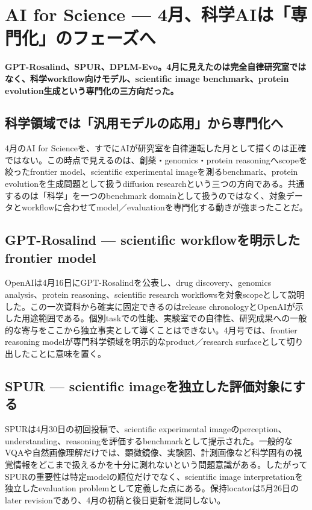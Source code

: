 \section{AI for Science — 4月、科学AIは「専門化」のフェーズへ}
\label{pkg:ai-science-april}
\noindent\textbf{GPT-Rosalind、SPUR、DPLM-Evo。4月に見えたのは完全自律研究室ではなく、科学workflow向けモデル、scientific image benchmark、protein evolution生成という専門化の三方向だった。}\autocite{src-078f0d540d88,src-7ae707d75c4b,src-f0bb84fcd319}

\subsection{科学領域では「汎用モデルの応用」から専門化へ}

4月のAI for Scienceを、すでにAIが研究室を自律運転した月として描くのは正確ではない。この時点で見えるのは、創薬・genomics・protein reasoningへscopeを絞ったfrontier model、scientific experimental imageを測るbenchmark、protein evolutionを生成問題として扱うdiffusion researchという三つの方向である。共通するのは「科学」を一つのbenchmark domainとして扱うのではなく、対象データとworkflowに合わせてmodel／evaluationを専門化する動きが強まったことだ。\autocite{src-078f0d540d88,src-7ae707d75c4b,src-f0bb84fcd319}


\subsection{GPT-Rosalind — scientific workflowを明示したfrontier model}

OpenAIは4月16日にGPT-Rosalindを公表し、drug discovery、genomics analysis、protein reasoning、scientific research workflowsを対象scopeとして説明した。この一次資料から確実に固定できるのはrelease chronologyとOpenAIが示した用途範囲である。個別taskでの性能、実験室での自律性、研究成果への一般的な寄与をここから独立事実として導くことはできない。4月号では、frontier reasoning modelが専門科学領域を明示的なproduct／research surfaceとして切り出したことに意味を置く。\autocite{src-078f0d540d88}


\subsection{SPUR — scientific imageを独立した評価対象にする}

SPURは4月30日の初回投稿で、scientific experimental imageのperception、understanding、reasoningを評価するbenchmarkとして提示された。一般的なVQAや自然画像理解だけでは、顕微鏡像、実験図、計測画像など科学固有の視覚情報をどこまで扱えるかを十分に測れないという問題意識がある。したがってSPURの重要性は特定modelの順位だけでなく、scientific image interpretationを独立したevaluation problemとして定義した点にある。保持locatorは5月26日のlater revisionであり、4月の初稿と後日更新を混同しない。\autocite{src-7ae707d75c4b}


